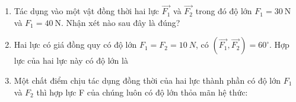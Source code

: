\begin{enumerate}[label=\bfseries Câu \arabic*:]
{		Một chất điểm đứng yên dưới tác dụng của $3$ lực có độ lớn bằng nhau thì ba lực có giá cùng nằm trong 1 mặt phẳng, chúng lần lượt hợp với nhau những góc $120^\circ$.
		
	}
	\item {}
	
	{ Tác dụng vào một vật đồng thời hai lực $\vec{F_1}$  và $\vec{F_2}$ trong đó độ lớn $F_1 = 30\ \text{N}$ và $F_1 = 40\ \text{N}$. Nhận xét nào sau đây là đúng?
	}
	
	
	
	\item {}
	
	{ Hai lực có giá đồng quy có độ lớn $F_1=F_2=10\ N$, có $(\overrightarrow {F_1}, \overrightarrow {F_2})=60^\circ$. Hợp lực của hai lực này có độ lớn là
		
	}
	\item {}
	
	{ Một chất điểm chịu tác dụng đồng thời của hai lực thành phần có độ lớn $F_1$ và $F_2$ thì hợp lực F của chúng luôn có độ lớn thỏa mãn hệ thức:
		
}
\end{enumerate}
